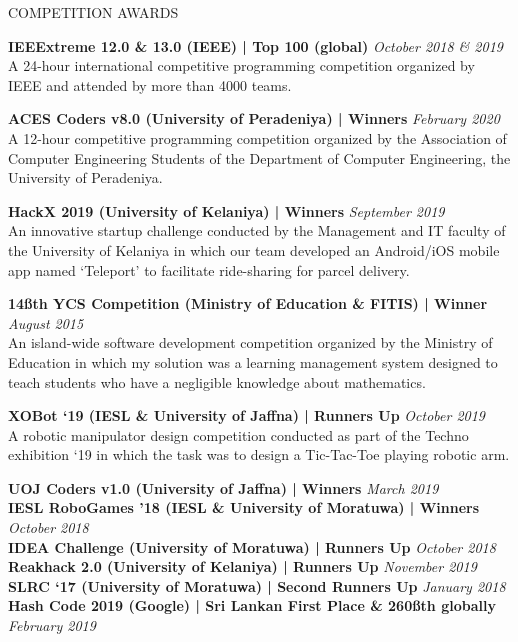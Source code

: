 \documentclass{cv}
\begin{document}
\begin{rSection}{COMPETITION AWARDS}{
    {\bf IEEExtreme 12.0 \& 13.0 (IEEE) | Top 100 (global)}                         \hfill {\em October 2018 \& 2019}
    \\A 24-hour international competitive programming competition organized by IEEE and attended by more than 4000 teams. \par

    {\bf ACES Coders v8.0 (University of Peradeniya) | Winners}                     \hfill {\em February 2020}
    \\A 12-hour competitive programming competition organized by the Association of Computer Engineering Students of the Department of Computer Engineering, the University of Peradeniya.\par

    {\bf HackX 2019 (University of Kelaniya) | Winners}                             \hfill {\em September 2019}
    \\An innovative startup challenge conducted by the Management and IT faculty of the University of Kelaniya in which our team developed an Android/iOS mobile app named `Teleport' to facilitate ride-sharing for parcel delivery.\par

    {\bf 14\ss{th} YCS Competition (Ministry of Education \& FITIS) | Winner}       \hfill {\em August 2015}
    \\An island-wide software development competition organized by the Ministry of Education in which my solution was a learning management system designed to teach students who have a negligible knowledge about mathematics.\par

    {\bf XOBot `19 (IESL \& University of Jaffna) | Runners Up}                     \hfill {\em October 2019}
    \\A robotic manipulator design competition conducted as part of the Techno exhibition `19 in which the task was to design a Tic-Tac-Toe playing robotic arm.\par

    {\bf UOJ Coders v1.0 (University of Jaffna) | Winners}                          \hfill {\em March 2019} \\
    {\bf IESL RoboGames '18 (IESL \& University of Moratuwa) | Winners}             \hfill {\em October 2018} \\
    {\bf IDEA Challenge (University of Moratuwa) | Runners Up}                      \hfill {\em October 2018} \\
    {\bf Reakhack 2.0 (University of Kelaniya) | Runners Up}                        \hfill {\em November 2019} \\
    {\bf SLRC `17 (University of Moratuwa) | Second Runners Up}                     \hfill {\em January 2018} \\
    {\bf Hash Code 2019 (Google) | Sri Lankan First Place \& 260\ss{th} globally}   \hfill {\em February 2019} \par

    }\end{rSection}
\end{document}
